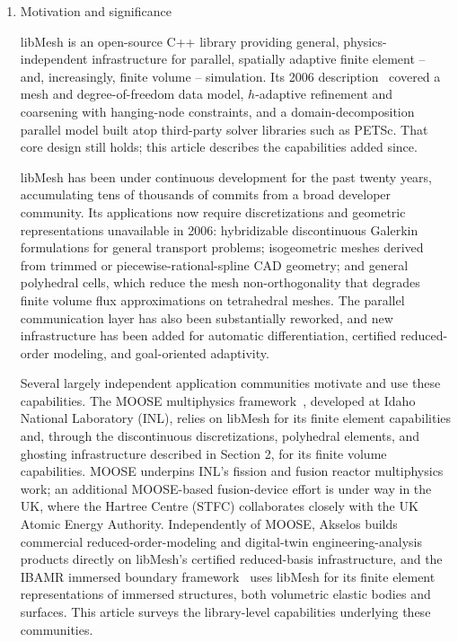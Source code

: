 \documentclass[preprint,12pt, a4paper]{elsarticle}
\begin{document}
\begin{enumerate}

\item Motivation and significance

libMesh is an open-source C++ library providing general, physics-independent infrastructure for
parallel, spatially adaptive finite element -- and, increasingly, finite volume -- simulation. Its
2006 description~\cite{kirk2006libmesh} covered a mesh and degree-of-freedom data model,
$h$-adaptive refinement and coarsening with hanging-node constraints, and a domain-decomposition
parallel model built atop third-party solver libraries such as PETSc. That core design still
holds; this article describes the capabilities added since.

libMesh has been under continuous development for the past twenty years, accumulating tens of
thousands of commits from a broad developer community. Its applications now require
discretizations and geometric representations unavailable in 2006: hybridizable discontinuous Galerkin formulations for general transport problems; isogeometric meshes
derived from trimmed or piecewise-rational-spline CAD geometry; and general polyhedral cells, which
reduce the mesh non-orthogonality that degrades finite volume flux approximations on tetrahedral
meshes. The parallel communication layer has also been substantially
reworked, and new infrastructure has been added for automatic differentiation, certified
reduced-order modeling, and goal-oriented adaptivity.

Several largely independent application communities motivate and use these capabilities. The
MOOSE multiphysics framework~\cite{harbour2025moose}, developed at Idaho National Laboratory
(INL), relies on libMesh for its finite element capabilities and, through the discontinuous
discretizations, polyhedral elements, and ghosting infrastructure described in Section 2, for its
finite volume capabilities. MOOSE underpins INL's fission and fusion reactor multiphysics work; an additional
MOOSE-based fusion-device effort is under way in the UK, where the Hartree Centre (STFC)
collaborates closely with the UK Atomic Energy Authority. Independently of MOOSE, Akselos builds
commercial reduced-order-modeling and digital-twin engineering-analysis products directly on
libMesh's certified reduced-basis infrastructure, and the IBAMR immersed boundary
framework~\cite{griffith2017ibfe} uses libMesh for its finite element representations of
immersed structures, both volumetric elastic bodies and surfaces. This article surveys the library-level capabilities underlying these
communities.


\end{enumerate}
\end{document}
